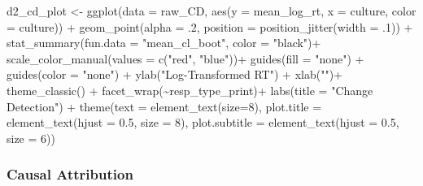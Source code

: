 \documentclass[
]{article}
\newenvironment{Shaded}{\begin{snugshade}}{\end{snugshade}}
\newcommand{\AttributeTok}[1]{\textcolor[rgb]{0.77,0.63,0.00}{#1}}
\newcommand{\DecValTok}[1]{\textcolor[rgb]{0.00,0.00,0.81}{#1}}
\newcommand{\FloatTok}[1]{\textcolor[rgb]{0.00,0.00,0.81}{#1}}
\newcommand{\FunctionTok}[1]{\textcolor[rgb]{0.00,0.00,0.00}{#1}}
\newcommand{\NormalTok}[1]{#1}
\newcommand{\OtherTok}[1]{\textcolor[rgb]{0.56,0.35,0.01}{#1}}
\newcommand{\SpecialCharTok}[1]{\textcolor[rgb]{0.00,0.00,0.00}{#1}}
\newcommand{\StringTok}[1]{\textcolor[rgb]{0.31,0.60,0.02}{#1}}
\begin{document}
\begin{Shaded}
\begin{Highlighting}[]
\NormalTok{d2\_cd\_plot }\OtherTok{\textless{}{-}} \FunctionTok{ggplot}\NormalTok{(}\AttributeTok{data =}\NormalTok{ raw\_CD, }
       \FunctionTok{aes}\NormalTok{(}\AttributeTok{y =}\NormalTok{ mean\_log\_rt, }\AttributeTok{x =}\NormalTok{ culture, }\AttributeTok{color =}\NormalTok{ culture)) }\SpecialCharTok{+}
\FunctionTok{geom\_point}\NormalTok{(}\AttributeTok{alpha =}\NormalTok{ .}\DecValTok{2}\NormalTok{, }\AttributeTok{position =} \FunctionTok{position\_jitter}\NormalTok{(}\AttributeTok{width =}\NormalTok{ .}\DecValTok{1}\NormalTok{)) }\SpecialCharTok{+} 
                    \FunctionTok{stat\_summary}\NormalTok{(}\AttributeTok{fun.data =} \StringTok{"mean\_cl\_boot"}\NormalTok{, }\AttributeTok{color =} \StringTok{"black"}\NormalTok{)}\SpecialCharTok{+}
\FunctionTok{scale\_color\_manual}\NormalTok{(}\AttributeTok{values =} \FunctionTok{c}\NormalTok{(}\StringTok{"red"}\NormalTok{, }\StringTok{"blue"}\NormalTok{))}\SpecialCharTok{+}
\FunctionTok{guides}\NormalTok{(}\AttributeTok{fill =} \StringTok{"none"}\NormalTok{) }\SpecialCharTok{+}
\FunctionTok{guides}\NormalTok{(}\AttributeTok{color =} \StringTok{"none"}\NormalTok{) }\SpecialCharTok{+}
\FunctionTok{ylab}\NormalTok{(}\StringTok{"Log{-}Transformed RT"}\NormalTok{) }\SpecialCharTok{+} 
\FunctionTok{xlab}\NormalTok{(}\StringTok{""}\NormalTok{)}\SpecialCharTok{+}
\FunctionTok{theme\_classic}\NormalTok{() }\SpecialCharTok{+}
  \FunctionTok{facet\_wrap}\NormalTok{(}\SpecialCharTok{\textasciitilde{}}\NormalTok{resp\_type\_print)}\SpecialCharTok{+}
  \FunctionTok{labs}\NormalTok{(}\AttributeTok{title =} \StringTok{"Change Detection"}\NormalTok{)  }\SpecialCharTok{+} 
  \FunctionTok{theme}\NormalTok{(}\AttributeTok{text =} \FunctionTok{element\_text}\NormalTok{(}\AttributeTok{size=}\DecValTok{8}\NormalTok{),}
      \AttributeTok{plot.title =} \FunctionTok{element\_text}\NormalTok{(}\AttributeTok{hjust =} \FloatTok{0.5}\NormalTok{, }\AttributeTok{size =} \DecValTok{8}\NormalTok{), }
      \AttributeTok{plot.subtitle =} \FunctionTok{element\_text}\NormalTok{(}\AttributeTok{hjust =} \FloatTok{0.5}\NormalTok{, }\AttributeTok{size =} \DecValTok{6}\NormalTok{))  }
\end{Highlighting}
\end{Shaded}

\hypertarget{causal-attribution}{%
\subsubsection{Causal Attribution}\label{causal-attribution}}
\end{document}
